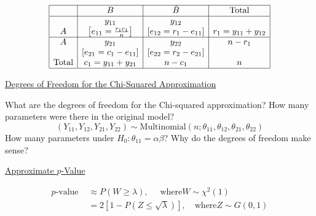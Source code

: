 \[ \begin{array}{|c|c|c|c|}
        \hline       & B                                           & \bar{B}                            & \text{Total}        \\
        \hline
                     & y_{11}                                      & y_{12}                             &                     \\
        A            & {\left[e_{11}=\frac{r_{1} c_{1}}{n}\right]} & {\left[e_{12}=r_{1}-e_{11}\right]} & r_{1}=y_{11}+y_{12} \\
        \hline A     & y_{21}                                      & y_{22}                             & n-r_{1}             \\
                     & {\left[e_{21}=c_{1}-e_{11}\right]}          & {\left[e_{22}=r_{2}-e_{21}\right]} &                     \\
        \text{Total} & c_{1}=y_{11}+y_{21}                         & n-c_{1}                            & n                   \\
        \hline
    \end{array} \]

\underline{Degrees of Freedom for the Chi-Squared Approximation}

What are the degrees of freedom for the Chi-squared approximation?
How many parameters were there in the original model?
\[
    \left(Y_{11}, Y_{12}, Y_{21}, Y_{22}\right) \sim \text{Multinomial}\left(n ; \theta_{11}, \theta_{12}, \theta_{21}, \theta_{22}\right)
\]
How many parameters under $H_{0}: \theta_{11}=\alpha \beta $?
Why do the degrees of freedom make sense?

\underline{Approximate $ p $-Value}

\[ \begin{aligned}
        p \text{-value } & \approx P(W \geq \lambda), \quad \text{ where} W \sim \chi^{2}(1) \\
                         & =2[1-P(Z \leq \sqrt{\lambda})], \quad \text{where} Z \sim G(0,1)
    \end{aligned} \]


